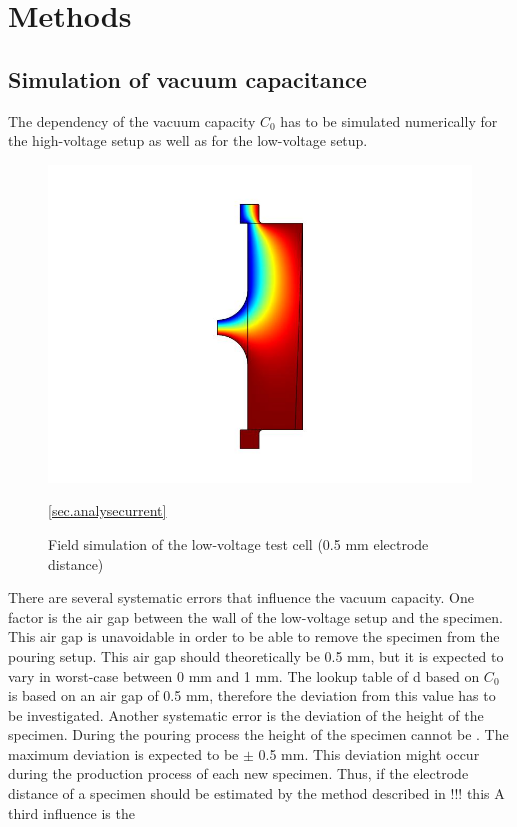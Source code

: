 \chapter{Methods}

\section{Simulation of vacuum capacitance} 
The dependency of the vacuum capacity $C_0$ has to be simulated numerically for the high-voltage setup as well as for the low-voltage setup. 
\begin{figure}[htbp]
	\centering
	\includegraphics{figures/COMSOL_Beispielbild.jpg}		
	\caption[Kurze Abbildungsbeschreibung]{Field simulation of the low-voltage test cell (0.5 mm electrode distance)} \ref{sec.analysecurrent}
	\label{fig.waveforms}
\end{figure}
 
There are several systematic errors that influence the vacuum capacity. One factor is the air gap between the wall of the low-voltage setup and the specimen. This air gap is unavoidable in order to be able to remove the specimen from the pouring setup. This air gap should theoretically be 0.5 mm, but it is expected to vary in worst-case between 0 mm and 1 mm. The lookup table of d based on $C_0$ is based on an air gap of 0.5 mm, therefore the deviation from this value has to be investigated. 
Another systematic error is the deviation of the height of the specimen. During  the pouring process the height of the specimen cannot be . The maximum deviation is expected to be $\pm$ 0.5 mm. This deviation might occur during the production process of each new specimen. Thus, if the electrode distance of a specimen should be estimated by the method described in !!! this 
A third influence is the 




